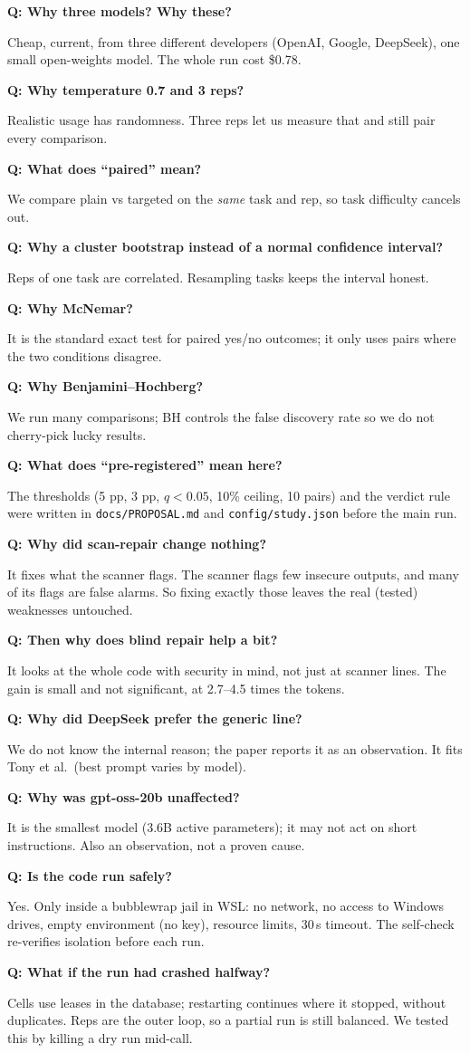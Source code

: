 \documentclass[11pt]{article}
\newcommand{\q}[1]{\par\medskip\noindent\textbf{Q: #1}\par}
\begin{document}
\q{Why three models? Why these?}
Cheap, current, from three different developers (OpenAI, Google, DeepSeek), one small open-weights model. The whole
run cost \$0.78.

\q{Why temperature 0.7 and 3 reps?}
Realistic usage has randomness. Three reps let us measure that and still pair every comparison.

\q{What does ``paired'' mean?}
We compare plain vs targeted on the \emph{same} task and rep, so task difficulty cancels out.

\q{Why a cluster bootstrap instead of a normal confidence interval?}
Reps of one task are correlated. Resampling tasks keeps the interval honest.

\q{Why McNemar?}
It is the standard exact test for paired yes/no outcomes; it only uses pairs where the two conditions disagree.

\q{Why Benjamini--Hochberg?}
We run many comparisons; BH controls the false discovery rate so we do not cherry-pick lucky results.

\q{What does ``pre-registered'' mean here?}
The thresholds (5 pp, 3 pp, $q<0.05$, 10\% ceiling, 10 pairs) and the verdict rule were written in
\texttt{docs/PROPOSAL.md} and \texttt{config/study.json} before the main run.

\q{Why did scan-repair change nothing?}
It fixes what the scanner flags. The scanner flags few insecure outputs, and many of its flags are false alarms. So
fixing exactly those leaves the real (tested) weaknesses untouched.

\q{Then why does blind repair help a bit?}
It looks at the whole code with security in mind, not just at scanner lines. The gain is small and not significant,
at 2.7--4.5 times the tokens.

\q{Why did DeepSeek prefer the generic line?}
We do not know the internal reason; the paper reports it as an observation. It fits Tony et al.\ (best prompt
varies by model).

\q{Why was gpt-oss-20b unaffected?}
It is the smallest model (3.6B active parameters); it may not act on short instructions. Also an observation, not a
proven cause.

\q{Is the code run safely?}
Yes. Only inside a bubblewrap jail in WSL: no network, no access to Windows drives, empty environment (no key),
resource limits, 30\,s timeout. The self-check re-verifies isolation before each run.

\q{What if the run had crashed halfway?}
Cells use leases in the database; restarting continues where it stopped, without duplicates. Reps are the outer loop,
so a partial run is still balanced. We tested this by killing a dry run mid-call.
\end{document}
